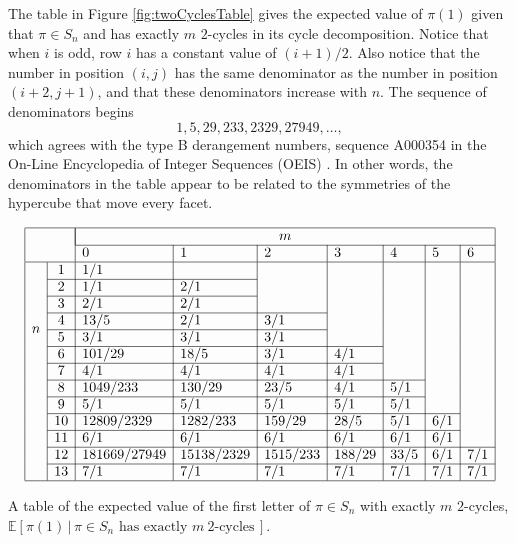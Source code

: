 The table in Figure \ref{fig:twoCyclesTable} gives the expected value of $\pi(1)$ given that
$\pi \in S_n$ and has exactly $m$ $2$-cycles in its cycle decomposition.
Notice that when $i$ is odd, row $i$ has a constant value of $(i+1)/2$. Also
notice that the number in position $(i,j)$ has the same denominator as the
number in position $(i+2, j+1)$, and that these denominators increase with $n$.
The sequence of denominators begins \begin{equation}
  1, 5, 29, 233, 2329, 27949, \dots,
\end{equation}
which agrees with the type B derangement numbers,
sequence A000354 in the On-Line Encyclopedia of Integer Sequences (OEIS) \cite{oeis}.
In other words, the denominators in the table appear to be related to
the symmetries of the hypercube that move every facet.
\begin{table}
  \[
  \begin{array}{|ll|l|l|l|l|l|l|l|l|l|l|}
  \hline
  & & \multicolumn{7}{|c|}{m} \\ \cline{3-9}
  & & 0 & 1 & 2 & 3 & 4 & 5 & 6 \\ \hline
  \multirow{8}{*}{$n$}
  & \n{1}  & 1/1          &            &          &        &      &     &     \\ \cline{2-4}
  & \n{2}  & 1/1          & 2/1        &          &        &      &     &     \\ \cline{2-4}
  & \n{3}  & 2/1          & 2/1        &          &        &      &     &     \\ \cline{2-5}
  & \n{4}  & 13/5         & 2/1        & 3/1      &        &      &     &     \\ \cline{2-5}
  & \n{5}  & 3/1          & 3/1        & 3/1      &        &      &     &     \\ \cline{2-6}
  & \n{6}  & 101/29       & 18/5       & 3/1      & 4/1    &      &     &     \\ \cline{2-6}
  & \n{7}  & 4/1          & 4/1        & 4/1      & 4/1    &      &     &     \\ \cline{2-7}
  & \n{8}  & 1049/233     & 130/29     & 23/5     & 4/1    & 5/1  &     &     \\ \cline{2-7}
  & \n{9}  & 5/1          & 5/1        & 5/1      & 5/1    & 5/1  &     &     \\ \cline{2-8}
  & \n{10} & 12809/2329   & 1282/233   & 159/29   & 28/5   & 5/1  & 6/1 &     \\ \cline{2-8}
  & \n{11} & 6/1          & 6/1        & 6/1      & 6/1    & 6/1  & 6/1 &     \\ \cline{2-9}
  & \n{12} & 181669/27949 & 15138/2329 & 1515/233 & 188/29 & 33/5 & 6/1 & 7/1 \\ \cline{2-9}
  & \n{13} & 7/1          & 7/1        & 7/1      & 7/1    & 7/1  & 7/1 & 7/1 \\ \hline
  \end{array}
  \]
  \caption[The expected value of $\pi(1)$ for $\pi \in S_n$ with $m$ $2$-cycles.]{
    A table of the expected value of the first letter of $\pi \in S_n$ with
    exactly $m$ $2$-cycles,
    ${\mathbb{E}[\pi(1)\, |\, \pi \in S_n \text{ has exactly } m\ 2 \text{-cycles}\,]}$.
  }
  \label{fig:twoCyclesTable}
\end{table}
